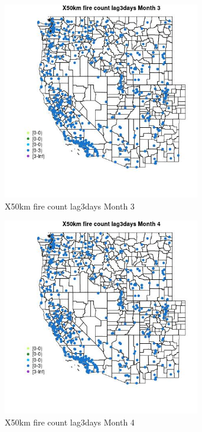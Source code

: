 \begin{figure} 
\centering  
\includegraphics[width=0.77\textwidth]{Code_Outputs/Report_ML_input_PM25_Step4_part_e_de_duplicated_aves_compiled_2019-05-14wNAs_MapObsMo3X50km_fire_count_lag3days.jpg} 
\caption{\label{fig:Report_ML_input_PM25_Step4_part_e_de_duplicated_aves_compiled_2019-05-14wNAsMapObsMo3X50km_fire_count_lag3days}X50km fire count lag3days Month 3} 
\end{figure} 
 

\begin{figure} 
\centering  
\includegraphics[width=0.77\textwidth]{Code_Outputs/Report_ML_input_PM25_Step4_part_e_de_duplicated_aves_compiled_2019-05-14wNAs_MapObsMo4X50km_fire_count_lag3days.jpg} 
\caption{\label{fig:Report_ML_input_PM25_Step4_part_e_de_duplicated_aves_compiled_2019-05-14wNAsMapObsMo4X50km_fire_count_lag3days}X50km fire count lag3days Month 4} 
\end{figure} 
 

